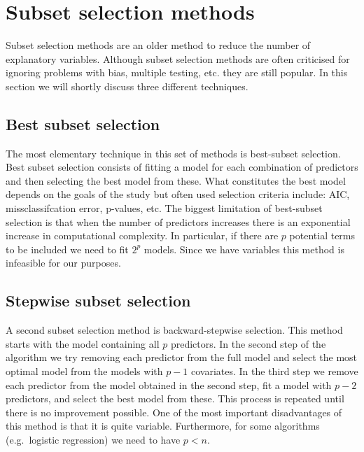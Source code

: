 \section{Subset selection methods}
\label{sec:SubsetSelectionMethods}
Subset selection methods are an older method to reduce the number of explanatory variables. Although subset selection methods are often criticised for ignoring problems with bias, multiple testing, etc. \parencite{whittingham_why_2006} they are still popular. In this section we will shortly discuss three different techniques. \\

\subsection{Best subset selection}
The most elementary technique in this set of methods is best-subset selection. Best subset selection consists of fitting a model for each combination of predictors and then selecting the best model from these. What constitutes the best model depends on the goals of the study but often used selection criteria include: AIC, missclassifcation error, p-values, etc. The biggest limitation of best-subset selection is that when the number of predictors increases there is an exponential increase in computational complexity. In particular, if there are $p$ potential terms to be included we need to fit $2^p$ models. Since we have  variables this method is infeasible for our purposes.\\

\subsection{Stepwise subset selection}
A second subset selection method is backward-stepwise selection. This method starts with the model containing all $p$ predictors. In the second step of the algorithm we try removing each predictor from the full model and select the most optimal model from the models with $p-1$ covariates. In the third step we remove each predictor from the model obtained in the second step, fit a model with $p-2$ predictors, and select the best model from these. This process is repeated until there is no improvement possible. One of the most important disadvantages of this method is that it is quite variable. Furthermore, for some algorithms (e.g.\ logistic regression) we need to have $p < n$.
\\

